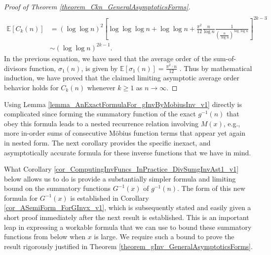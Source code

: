 \documentclass[11pt,reqno,a4letter]{article}
\numberwithin{figure}{section}
\numberwithin{table}{section}
\theoremstyle{plain}
\numberwithin{theorem}{section}
\theoremstyle{definition}
\begin{document}
\begin{proof}[Proof of Theorem \ref{theorem_Ckn_GeneralAsymptoticsForms}]
{\begin{align*}
     \end{align*} 
}
\begin{align*} 
\mathbb{E}[C_k(n)] & = (\log\log n)^2 \left[
     \log\log\log n + \log\log n + \frac{\pi^2}{12} \frac{n}{\log n} \frac{1}{\left( 
     \frac{n}{\log n}\right)^{\log\log n}} 
     \right]^{2k-3} \\ 
     & \sim (\log\log n)^{2k-1}. 
\end{align*} 
In the previous equation, we have used that the average order of the sum-of-divisors function, $\sigma_1(n)$, 
is given by $\mathbb{E}[\sigma_1(n)] = \frac{\pi^2 \cdot n}{12}$ \cite[\S 27.11]{NISTHB}. 
Thus by mathematical induction, we have proved that the claimed limiting asymptotic average order 
behavior holds for $C_k(n)$ whenever $k \geq 1$ as $n \rightarrow \infty$. 
\end{proof} 

Using Lemma \ref{lemma_AnExactFormulaFor_gInvByMobiusInv_v1} directly is complicated since 
forming the summatory function of the exact $g^{-1}(n)$ that obey this formula leads to 
a nested recurrence relation involving $M(x)$, e.g., 
more in-order sums of consecutive M\"obius function terms that appear yet again in nested form. 
The next corollary provides the specific 
inexact, and asymptotically accurate formula for these inverse functions that we have in mind. 

What Corollary \ref{cor_ComputingInvFuncs_InPractice_DivSumgInvAst1_v1} below 
allows us to do is 
provide a substantially simpler formula and limiting bound on the summatory functions 
$G^{-1}(x)$ of $g^{-1}(n)$. The form of this new formula for $G^{-1}(x)$ is 
established in Corollary \ref{cor_ASemiForm_ForGInvx_v1}, which is subsequently stated and 
easily given a short proof immediately after the next result is established. 
This is an important leap in expressing a workable formula that we can use to bound these 
summatory functions from below when $x$ is large. We require such a bound to prove the result 
rigorously justified in Theorem \ref{theorem_gInv_GeneralAsymptoticsForms}. 
\end{document}
